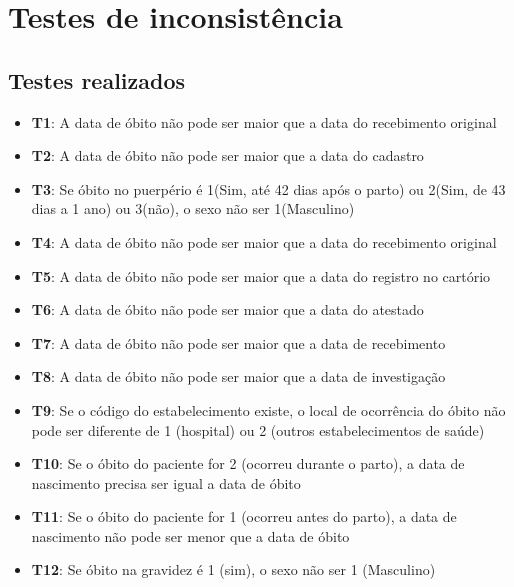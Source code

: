 \documentclass[
  12,
  table]{proadi}
\providecommand{\tightlist}{%
  \setlength{\itemsep}{0pt}\setlength{\parskip}{0pt}}
\begin{document}
\newpage

\hypertarget{testes-de-inconsistuxeancia}{%
\section*{Testes de inconsistência}\label{testes-de-inconsistuxeancia}}

\hypertarget{testes-realizados}{%
\subsection*{Testes realizados}\label{testes-realizados}}

\begin{itemize}
\tightlist
\item
  \textbf{T1}: A data de óbito não pode ser maior que a data do
  recebimento original
\item
  \textbf{T2}: A data de óbito não pode ser maior que a data do cadastro
\item
  \textbf{T3}: Se óbito no puerpério é 1(Sim, até 42 dias após o parto)
  ou 2(Sim, de 43 dias a 1 ano) ou 3(não), o sexo não ser 1(Masculino)
\item
  \textbf{T4}: A data de óbito não pode ser maior que a data do
  recebimento original
\item
  \textbf{T5}: A data de óbito não pode ser maior que a data do registro
  no cartório
\item
  \textbf{T6}: A data de óbito não pode ser maior que a data do atestado
\item
  \textbf{T7}: A data de óbito não pode ser maior que a data de
  recebimento
\item
  \textbf{T8}: A data de óbito não pode ser maior que a data de
  investigação
\item
  \textbf{T9}: Se o código do estabelecimento existe, o local de
  ocorrência do óbito não pode ser diferente de 1 (hospital) ou 2
  (outros estabelecimentos de saúde)
\item
  \textbf{T10}: Se o óbito do paciente for 2 (ocorreu durante o parto),
  a data de nascimento precisa ser igual a data de óbito
\item
  \textbf{T11}: Se o óbito do paciente for 1 (ocorreu antes do parto), a
  data de nascimento não pode ser menor que a data de óbito
\item
  \textbf{T12}: Se óbito na gravidez é 1 (sim), o sexo não ser 1
  (Masculino)

\end{itemize}
\end{document}

